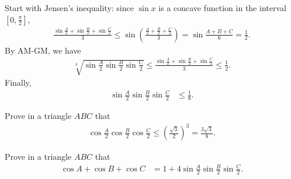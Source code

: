 \begin{solution}
Start with Jensen's inequality: since $\sin x$ is a concave function in the interval $\left[0, \frac{\pi}{2}\right]$,
    \begin{align*}
        \frac{\sin \frac A2 + \sin \frac B2 + \sin \frac C2 }{3} \leq \sin\left(\frac{\frac A2 + \frac B2 + \frac C2}{3}\right) = \sin \frac{A+B+C}{6} = \frac 12.
    \end{align*}
By AM-GM, we have
    \begin{align*}
        \sqrt[3]{\sin\frac{A}{2}\sin\frac{B}{2}\sin\frac{C}{2}} \leq \frac{\sin \frac A2 + \sin \frac B2 + \sin \frac C2 }{3} \leq \frac{1}{2}.
    \end{align*}
Finally,
    \begin{align*}
        \sin{\frac{A}{2}}\sin{\frac{B}{2}}\sin{\frac{C}{2}} &\le \frac{1}{8}.
    \end{align*}
\end{solution}

\begin{question}
Prove in a triangle $ABC$ that
    \begin{align*}
        \cos\frac{A}{2}\cos\frac{B}{2}\cos\frac{C}{2} \leq \left(\frac{\sqrt{3}}{2}\right)^3 = \frac{3\sqrt{3}}{8}.
    \end{align*}
\end{question}

\begin{question}
Prove in a triangle $ABC$ that
    \begin{align}
        \cos{A} +\cos{B}+\cos{C}&=1+4\sin{\frac{A}{2}}\sin{\frac{B}{2}}\sin{\frac{C}{2}}. \label{Q5}
    \end{align}
\end{question}

